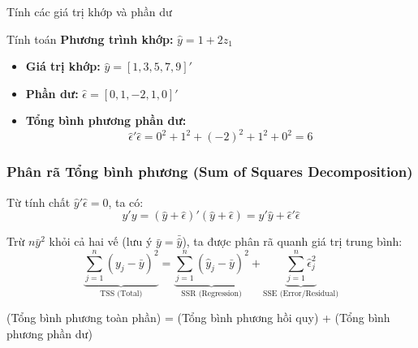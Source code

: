 \begin{frame}{Tính các giá trị khớp và phần dư}
    \begin{exampleblock}{Tính toán}
        \textbf{Phương trình khớp:} $\hat{y} = 1 + 2z_1$
        \pause
        \begin{itemize}
            \item \textbf{Giá trị khớp:} $\hat{y} = [1, 3, 5, 7, 9]'$
            \pause
            \item \textbf{Phần dư:} $\hat{\epsilon} = [0, 1, -2, 1, 0]'$
            \pause
            \item \textbf{Tổng bình phương phần dư:}
            \[
            \hat{\epsilon}'\hat{\epsilon} = 0^2 + 1^2 + (-2)^2 + 1^2 + 0^2 = 6
            \]
        \end{itemize}
    \end{exampleblock}
\end{frame}

\begin{frame}
    \frametitle{Phân rã Tổng bình phương (Sum of Squares Decomposition)}

    Từ tính chất $\hat{y}'\hat{\epsilon} = 0$, ta có:
    \[ y'y = (\hat{y} + \hat{\epsilon})'(\hat{y} + \hat{\epsilon}) = \hat{y}'\hat{y} + \hat{\epsilon}'\hat{\epsilon} \]

    \pause

    Trừ $n\bar{y}^2$ khỏi cả hai vế (lưu ý $\bar{y} = \bar{\hat{y}}$), ta được phân rã quanh giá trị trung bình:
    \begin{equation*}
        \underbrace{\sum_{j=1}^{n} (y_j - \bar{y})^2}_{\text{TSS (Total)}} = \underbrace{\sum_{j=1}^{n} (\hat{y}_j - \bar{y})^2}_{\text{SSR (Regression)}} + \underbrace{\sum_{j=1}^{n} \hat{\epsilon}_j^2}_{\text{SSE (Error/Residual)}}
    \end{equation*}

    \pause

    \begin{center}
        (Tổng bình phương toàn phần) = (Tổng bình phương hồi quy) + (Tổng bình phương phần dư)
    \end{center}

\end{frame}

